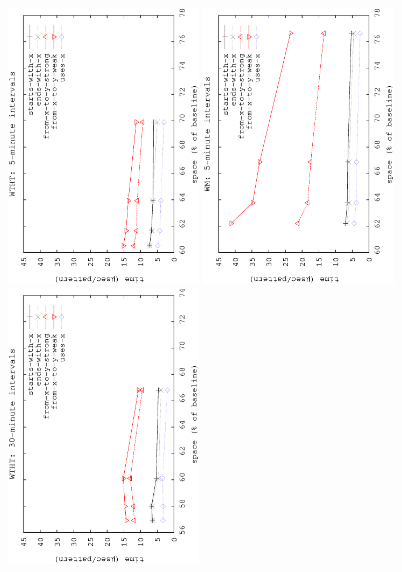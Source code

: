 \begin{figure}[!ht]
	\begin{center}
		{\includegraphics[angle=-90,width=0.45\textwidth]{figures_synt/madrid_ht5.eps}}
		{\includegraphics[angle=-90,width=0.45\textwidth]{figures_synt/madrid_wm5.eps}}
		{\includegraphics[angle=-90,width=0.45\textwidth]{figures_synt/madrid_ht30.eps}}

\end{center}
\end{figure}
